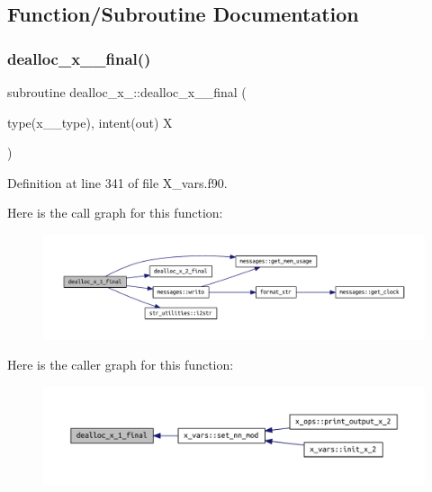 \subsection{Function/\+Subroutine Documentation}
\mbox{\label{X__vars_8f90_a0dacd775e322b824c05e804ad5291aa4}} 
\subsubsection{\texorpdfstring{dealloc\+\_\+x\+\_\+\_\+final()}{dealloc\_x\_1\_final()}}
{\footnotesize\ttfamily subroutine dealloc\+\_\+x\+\_\+::dealloc\+\_\+x\+\_\+\_\+final (\begin{DoxyParamCaption}\item[{type(x\+\_\+1\+\_\+type), intent(out)}]{X }\end{DoxyParamCaption})}



Definition at line 341 of file X\+\_\+vars.\+f90.

Here is the call graph for this function\+:
\nopagebreak
\begin{figure}[H]
\begin{center}
\leavevmode
\includegraphics[width=350pt]{X__vars_8f90_a0dacd775e322b824c05e804ad5291aa4_cgraph}
\end{center}
\end{figure}
Here is the caller graph for this function\+:
\nopagebreak
\begin{figure}[H]
\begin{center}
\leavevmode
\includegraphics[width=350pt]{X__vars_8f90_a0dacd775e322b824c05e804ad5291aa4_icgraph}
\end{center}
\end{figure}
\mbox{\label{X__vars_8f90_ad33ba3e63c71fe167351af3317dc22ec}} 
